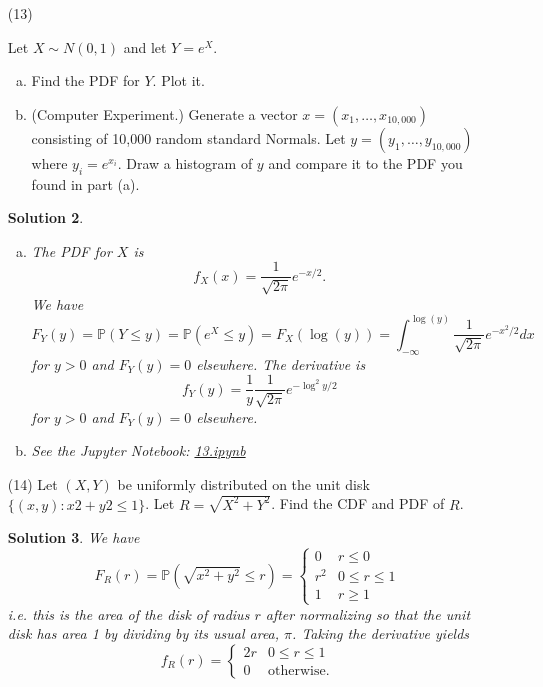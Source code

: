 \documentclass[10pt]{article}
\newtheorem*{sol}{Solution}
\renewcommand{\P}{\mathbb{P}}
\begin{document}
\begin{enumerate}
\begin{sol}
\begin{enumerate}[(a)]
On the other hand,
\[
\P(X=m,Y=n) = f_{X,Y}(m,n) =
\frac{e^{-\lambda}\lambda^{m+n}}{(m+n)!}\binom{m+n}{m}(1/2)^{m+n}
=\frac{e^{-\lambda} (\lambda/2)^{m+n}}{m!n!}.
\]
I.e. the first term in the product is the probability of $m+n$ total flips
and the second term is the probability of seeing $m$ heads and $n$ tails among
these flips. By our simplified expression for $f_X$ and $f_Y$ we see that
the above expression for $\P(X=m,Y=n)$ is equal to $\P(X=m)\P(Y=n)$
and $X$ and $Y$ are indeed independent.
\end{enumerate}
\end{sol}

\item[(13)]

Let $X\sim N(0,1)$ and let $Y = e^X$.

\begin{enumerate}[(a)]
\item Find the PDF for $Y$. Plot it.
\item (Computer Experiment.) Generate a vector $x = (x_1,\ldots,x_{10,000})$
consisting
of 10,000 random standard Normals. Let $y = (y_1,\ldots,y_{10,000})$
where $y_i = e^{x_i}$. Draw a histogram of $y$ and compare it to the PDF you
found in part (a).
\end{enumerate}

\begin{sol}
\begin{enumerate}[(a)]
\item The PDF for $X$ is
\[
f_X(x)=\frac{1}{\sqrt{2\pi}}e^{-x/2}.
\]
We have
\[
F_Y(y)=\P(Y\leq y)=\P(e^X\leq y)=F_X(\log(y))=
\int_{-\infty}^{\log(y)} \frac{1}{\sqrt{2\pi}}e^{-x^2/2}dx
\]
for $y>0$ and $F_Y(y)=0$ elsewhere.
The derivative is
\[
f_Y(y) = \frac{1}{y}\frac{1}{\sqrt{2\pi}}e^{-\log^2y/2}
\]
for $y>0$ and $F_Y(y)=0$ elsewhere.

\item

See the Jupyter Notebook:
\href{https://github.com/ajrasmus/some_of_statistics/blob/main/chapter_2/13.ipynb}{13.ipynb}
\end{enumerate}
\end{sol}

\item[(14)] Let $(X, Y)$ be uniformly distributed on the unit disk
$\{(x, y) : x2 + y2 \leq 1\}$. Let $R = \sqrt{X^2+Y^2}$.
Find the CDF and PDF of $R$.

\begin{sol}
We have
\[
F_R(r) = \P(\sqrt{x^2+y^2}\leq r)=
\begin{cases}
0 & r \leq 0 \\
r^2 & 0 \leq r \leq 1 \\
1 & r \geq 1
\end{cases}
\]
i.e. this is the area of the disk of radius $r$ after normalizing so that the
unit disk has area 1 by dividing by its usual area, $\pi$.
Taking the derivative yields
\[
f_R(r) = \begin{cases}
2r & 0\leq r \leq 1 \\
0 & \text{otherwise}.
\end{cases}
\]
\end{sol}


\end{enumerate}
\end{document}
